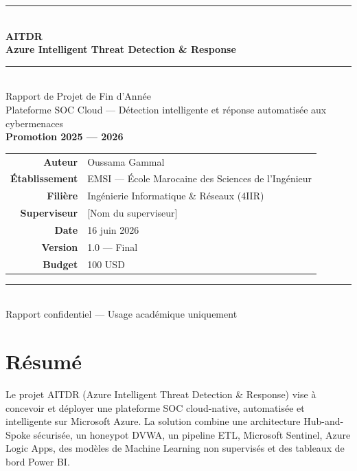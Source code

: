 \documentclass[11pt,a4paper]{report}
\begin{document}
\begin{titlepage}
\centering
\vspace*{1cm}
{\color{titleblue}\rule{\textwidth}{2pt}}\\[0.8cm]
{\Huge\bfseries\color{titleblue} AITDR}\\[0.5cm]
{\large\bfseries Azure Intelligent Threat Detection \& Response}\\[0.3cm]
{\color{titleblue}\rule{\textwidth}{0.5pt}}\\[1.5cm]
{\Large Rapport de Projet de Fin d'Année}\\[0.5cm]
{\normalsize Plateforme SOC Cloud --- Détection intelligente et réponse automatisée aux cybermenaces}\\[1.5cm]
{\large\bfseries Promotion 2025 --- 2026}\\[2cm]

\begin{tabular}{@{}rl@{}}
\textbf{Auteur}        & Oussama Gammal \\[4pt]
\textbf{Établissement} & EMSI --- École Marocaine des Sciences de l'Ingénieur \\[4pt]
\textbf{Filière}       & Ingénierie Informatique \& Réseaux (4IIR) \\[4pt]
\textbf{Superviseur}   & [Nom du superviseur] \\[4pt]
\textbf{Date}          & 16 juin 2026 \\[4pt]
\textbf{Version}       & 1.0 --- Final \\[4pt]
\textbf{Budget}        & 100 USD \\
\end{tabular}

\vfill
{\color{titleblue}\rule{\textwidth}{0.5pt}}\\[0.3cm]
{\small Rapport confidentiel --- Usage académique uniquement}
\end{titlepage}

\chapter*{Résumé}

Le projet AITDR (Azure Intelligent Threat Detection \& Response) vise à concevoir et déployer une plateforme SOC cloud-native, automatisée et intelligente sur Microsoft Azure. La solution combine une architecture Hub-and-Spoke sécurisée, un honeypot DVWA, un pipeline ETL, Microsoft Sentinel, Azure Logic Apps, des modèles de Machine Learning non supervisés et des tableaux de bord Power BI.
\end{document}
